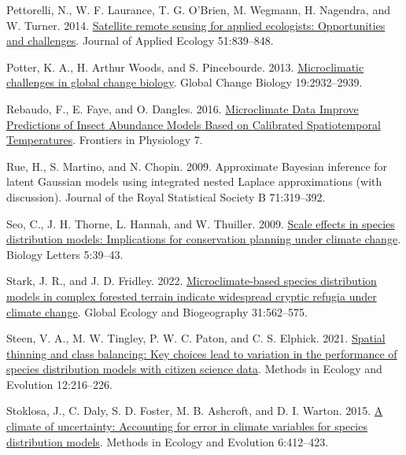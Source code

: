 \documentclass[
  12pt,
  a4paper]{article}
\newlength{\cslhangindent}
\newlength{\cslentryspacingunit} %
\newenvironment{CSLReferences}[2] %
 {%
  \setlength{\parindent}{0pt}
  \ifodd #1
  \let\oldpar\par
  \def\par{\hangindent=\cslhangindent\oldpar}
  \fi
  \setlength{\parskip}{#2\cslentryspacingunit}
 }%
 {}
\begin{document}
\begin{CSLReferences}{1}{0}
\leavevmode{}%
Pettorelli, N., W. F. Laurance, T. G. O'Brien, M. Wegmann, H. Nagendra, and W. Turner. 2014. \href{https://doi.org/10.1111/1365-2664.12261}{Satellite remote sensing for applied ecologists: Opportunities and challenges}. Journal of Applied Ecology 51:839--848.

\leavevmode{}%
Potter, K. A., H. Arthur Woods, and S. Pincebourde. 2013. \href{https://doi.org/10.1111/gcb.12257}{Microclimatic challenges in global change biology}. Global Change Biology 19:2932--2939.

\leavevmode{}%
Rebaudo, F., E. Faye, and O. Dangles. 2016. \href{https://www.frontiersin.org/article/10.3389/fphys.2016.00139}{Microclimate {Data} {Improve} {Predictions} of {Insect} {Abundance} {Models} {Based} on {Calibrated} {Spatiotemporal} {Temperatures}}. Frontiers in Physiology 7.

\leavevmode{}%
Rue, H., S. Martino, and N. Chopin. 2009. Approximate {Bayesian} inference for latent {Gaussian} models using integrated nested {Laplace} approximations (with discussion). Journal of the Royal Statistical Society B 71:319--392.

\leavevmode{}%
Seo, C., J. H. Thorne, L. Hannah, and W. Thuiller. 2009. \href{https://doi.org/10.1098/rsbl.2008.0476}{Scale effects in species distribution models: Implications for conservation planning under climate change}. Biology Letters 5:39--43.

\leavevmode{}%
Stark, J. R., and J. D. Fridley. 2022. \href{https://doi.org/10.1111/geb.13447}{Microclimate-based species distribution models in complex forested terrain indicate widespread cryptic refugia under climate change}. Global Ecology and Biogeography 31:562--575.

\leavevmode{}%
Steen, V. A., M. W. Tingley, P. W. C. Paton, and C. S. Elphick. 2021. \href{https://doi.org/10.1111/2041-210X.13525}{Spatial thinning and class balancing: {Key} choices lead to variation in the performance of species distribution models with citizen science data}. Methods in Ecology and Evolution 12:216--226.

\leavevmode{}%
Stoklosa, J., C. Daly, S. D. Foster, M. B. Ashcroft, and D. I. Warton. 2015. \href{https://doi.org/10.1111/2041-210X.12217}{A climate of uncertainty: Accounting for error in climate variables for species distribution models}. Methods in Ecology and Evolution 6:412--423.


\end{CSLReferences}
\end{document}
